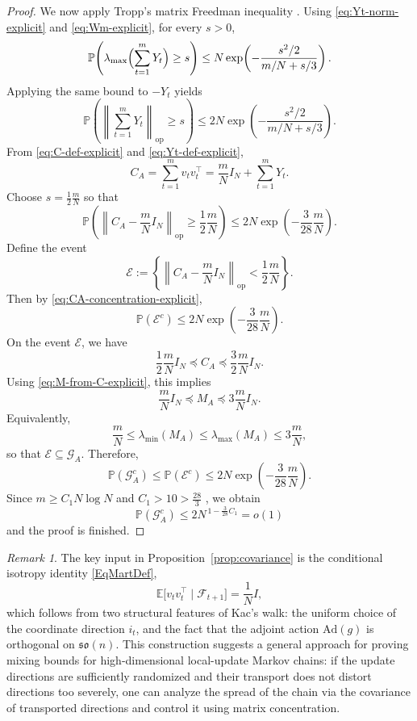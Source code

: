 \documentclass[11pt, reqno]{amsart}
\numberwithin{equation}{section}
\theoremstyle{remark}
\newtheorem{remark}{Remark}
\newcommand{\E}{\mathbb{E}}
\newcommand{\Prob}{\mathbb{P}}
\newcommand{\1}{\mathbf{1}}
\newcommand{\so}{\mathfrak{so}}
\newcommand{\op}{\mathrm{op}}
\newcommand{\Ad}{\mathrm{Ad}}
\begin{document}
\begin{proof}
We now apply Tropp's matrix Freedman inequality \cite[Theorem~1.2]{Tropp}.
Using \eqref{eq:Yt-norm-explicit} and \eqref{eq:Wm-explicit}, for every
$s>0$,
\[
\Prob\!\left(
\lambda_{\max}\Bigl(\sum_{t=1}^m Y_t\Bigr)\ge s
\right)
\le
N\exp\!\left(
-\frac{s^2/2}{m/N+s/3}
\right).
\]
Applying the same bound to $-Y_t$ yields
\begin{equation}
\label{eq:freedman-both-sides-explicit}
\Prob\!\left(
\left\|\sum_{t=1}^m Y_t\right\|_{\op}\ge s
\right)
\le
2N\exp\!\left(
-\frac{s^2/2}{m/N+s/3}
\right).
\end{equation}
From \eqref{eq:C-def-explicit} and \eqref{eq:Yt-def-explicit},
\[
C_A
=
\sum_{t=1}^m v_tv_t^\top
=
\frac{m}{N}I_N+\sum_{t=1}^m Y_t.
\]
Choose $s=\frac12\frac{m}{N}$ so that
\begin{equation}
\label{eq:CA-concentration-explicit}
\Prob\!\left(
\left\|C_A-\frac{m}{N}I_N\right\|_{\op}\ge \frac12\frac{m}{N}
\right)
\le
2N\exp\!\left(-\frac{3}{28}\frac{m}{N}\right).
\end{equation}
Define the event
\[
\mathcal E
:=
\left\{
\left\|C_A-\frac{m}{N}I_N\right\|_{\op}
<
\frac12\frac{m}{N}
\right\}.
\]
Then by \eqref{eq:CA-concentration-explicit},
\[
\Prob(\mathcal E^c)
\le
2N\exp\!\left(-\frac{3}{28}\frac{m}{N}\right).
\]
On the event $\mathcal E$, we have
\[
\frac12\frac{m}{N}I_N
\preceq
C_A
\preceq
\frac32\frac{m}{N}I_N.
\]
Using \eqref{eq:M-from-C-explicit}, this implies
\[
\frac{m}{N}I_N
\preceq
M_A
\preceq
3\frac{m}{N}I_N.
\]
Equivalently,
\[
\frac{m}{N}\le \lambda_{\min}(M_A)\le \lambda_{\max}(M_A)\le 3\frac{m}{N},
\]
so that $\mathcal E \subseteq \mathcal G_A$. Therefore,
\[
\Prob(\mathcal G_A^c)
\le
\Prob(\mathcal E^c)
\le
2N\exp\!\left(-\frac{3}{28}\frac{m}{N}\right).
\]
Since $m \ge C_1 N \log N$ and $C_1 > 10 > \frac{28}{3}$ , we obtain
\[
\Prob(\mathcal G_A^c)
\le
2N^{\,1-\frac{3}{28}C_1} = o(1)
\]
and the proof is finished.
\end{proof}
\begin{remark} \label{rem:keymallrm}
The key input in Proposition~\ref{prop:covariance} is the conditional isotropy identity \eqref{EqMartDef},
\[
\E\bigl[v_t v_t^\top \mid \mathcal F_{t+1}\bigr] = \frac{1}{N} I,
\]
which follows from two structural features of Kac’s walk: the uniform choice of the coordinate direction $i_t$, and the fact that the adjoint action $\Ad(g)$ is orthogonal on $\so(n)$. This construction suggests a general approach for proving mixing bounds for high-dimensional local-update Markov chains: if the update directions are sufficiently randomized and their transport does not distort directions too severely, one can analyze the spread of the chain via the covariance of transported directions and control it using matrix concentration.
\end{remark}
\end{document}
